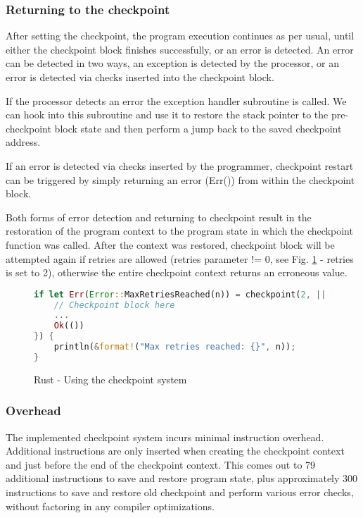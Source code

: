 \subsubsection{Returning to the checkpoint}

After setting the checkpoint, the program execution continues as per usual, until either the checkpoint block finishes successfully, or an error is detected. An error can be detected in two ways, an exception is detected by the processor, or an error is detected via checks inserted into the checkpoint block.

If the processor detects an error the exception handler subroutine is called. We can hook into this subroutine and use it to restore the stack pointer to the pre-checkpoint block state and then perform a jump back to the saved checkpoint address.

If an error is detected via checks inserted by the programmer, checkpoint restart can be triggered by simply returning an error (Err()) from within the checkpoint block.

Both forms of error detection and returning to checkpoint result in the restoration of the program context to the program state in which the checkpoint function was called. After the context was restored, checkpoint block will be attempted again if retries are allowed (retries parameter != 0, see Fig. \ref{fig:rust_using_checkpoint} - retries is set to 2), otherwise the entire checkpoint context returns an erroneous value.

\begin{figure}[!h]
\begin{lstlisting}[language=Rust]
if let Err(Error::MaxRetriesReached(n)) = checkpoint(2, || {
    // Checkpoint block here
    ...
    Ok(())
}) {
    println(&format!("Max retries reached: {}", n));
}
\end{lstlisting}
\caption{Rust - Using the checkpoint system}
\label{fig:rust_using_checkpoint}
\end{figure}

\subsubsection{Overhead}

The implemented checkpoint system incurs minimal instruction overhead. Additional instructions are only inserted when creating the checkpoint context and just before the end of the checkpoint context. This comes out to 79 additional instructions to save and restore program state, plus approximately 300 instructions to save and restore old checkpoint and perform various error checks, without factoring in any compiler optimizations.

